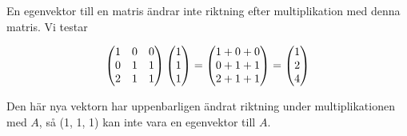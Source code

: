 \documentclass[../../main.tex]{subfiles}
\begin{document}
\begin{solution}{1}

En egenvektor till en matris ändrar inte riktning efter multiplikation med denna matris. Vi testar 

$$
\begin{pmatrix}
    1 & 0 & 0\\
    0 & 1 & 1\\
    2 & 1 & 1
\end{pmatrix} \begin{pmatrix}1\\1\\1\\\end{pmatrix} = 
\begin{pmatrix}1 + 0 + 0\\0 + 1 + 1\\2 +1 +1\end{pmatrix} = 
\begin{pmatrix}1\\2\\4\end{pmatrix}
$$

Den här nya vektorn har uppenbarligen ändrat riktning under multiplikationen med $A$, så (1, 1, 1) kan inte vara en egenvektor till $A$.

\end{solution}
\end{document}

